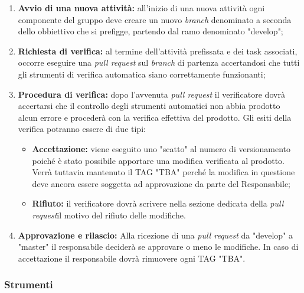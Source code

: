 	\begin{enumerate}
		\item \textbf{Avvio di una nuova attività: } all’inizio di una nuova attività ogni componente del gruppo
		deve creare un nuovo \textit{branch\glos} denominato a seconda dello obbiettivo che si prefigge, partendo dal ramo denominato "develop";
		\item \textbf{Richiesta di verifica: } al termine dell'attività prefissata e dei task associati, occorre eseguire una \textit{pull request\glo} sul \textit{branch\glo} di partenza accertandosi che tutti gli strumenti di verifica automatica siano correttamente funzionanti;
		\item \textbf{Procedura di verifica:} dopo l'avvenuta \textit{pull request\glo} il verificatore dovrà accertarsi che il controllo degli strumenti automatici non abbia prodotto alcun errore e procederà con la verifica effettiva del prodotto. Gli esiti della verifica potranno essere di due tipi:
		\begin{itemize}
			\item \textbf{Accettazione:} viene eseguito uno "scatto" al numero di versionamento poiché è stato possibile apportare una modifica verificata al prodotto. Verrà tuttavia mantenuto il TAG "TBA" perché la modifica in questione deve ancora essere soggetta ad approvazione da parte del Responsabile;
			\item \textbf{Rifiuto:} il verificatore dovrà scrivere nella sezione dedicata della
			\textit{pull request}\glo il motivo del rifiuto delle modifiche.
		\end{itemize}
		\item \textbf{Approvazione e rilascio:} Alla ricezione di una \textit{pull request\glo} da "develop" a "master" il responsabile deciderà se approvare o meno le modifiche. In caso di accettazione il responsabile dovrà rimuovere ogni TAG "TBA".
	\end{enumerate}


\subsubsection{Strumenti}
